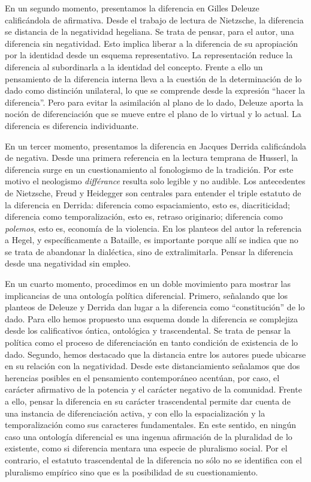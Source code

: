 En un segundo momento, presentamos la diferencia en Gilles Deleuze calificándola de afirmativa. Desde el trabajo de lectura de Nietzsche, la diferencia se distancia de la negatividad hegeliana. Se trata de pensar, para el autor, una diferencia sin negatividad. Esto implica liberar a la diferencia de su apropiación por la identidad desde un esquema representativo. La representación reduce la diferencia al subordinarla a la identidad del concepto. Frente a ello un pensamiento de la diferencia interna lleva a la cuestión de la determinación de lo dado como distinción unilateral, lo que se comprende desde la expresión \enquote{hacer la diferencia}. Pero para evitar la asimilación al plano de lo dado, Deleuze aporta la noción de diferenciación que se mueve entre el plano de lo virtual y lo actual. La diferencia es diferencia individuante.

En un tercer momento, presentamos la diferencia en Jacques Derrida calificándola de negativa. Desde una primera referencia en la lectura temprana de Husserl, la diferencia surge en un cuestionamiento al fonologismo de la tradición. Por este motivo el neologismo \emph{différance} resulta solo legible y no audible. Los antecedentes de Nietzsche, Freud y Heidegger son centrales para entender el triple estatuto de la diferencia en Derrida: diferencia como espaciamiento, esto es, diacriticidad; diferencia como temporalización, esto es, retraso originario; diferencia como \emph{polemos}, esto es, economía de la violencia. En los planteos del autor la referencia a Hegel, y específicamente a Bataille, es importante porque allí se indica que no se trata de abandonar la dialéctica, sino de extralimitarla. Pensar la diferencia desde una negatividad sin empleo.

En un cuarto momento, procedimos en un doble movimiento para mostrar las implicancias de una ontología política diferencial. Primero, señalando que los planteos de Deleuze y Derrida dan lugar a la diferencia como \enquote{constitución} de lo dado. Para ello hemos propuesto una esquema donde la diferencia se complejiza desde los calificativos óntica, ontológica y trascendental. Se trata de pensar la política como el proceso de diferenciación en tanto condición de existencia de lo dado. Segundo, hemos destacado que la distancia entre los autores puede ubicarse en su relación con la negatividad. Desde este distanciamiento señalamos que dos herencias posibles en el pensamiento contemporáneo acentúan, por caso, el carácter afirmativo de la potencia y el carácter negativo de la comunidad. Frente a ello, pensar la diferencia en su carácter trascendental permite dar cuenta de una instancia de diferenciación activa, y con ello la espacialización y la temporalización como sus caracteres fundamentales. En este sentido, en ningún caso una ontología diferencial es una ingenua afirmación de la pluralidad de lo existente, como si diferencia mentara una especie de pluralismo social. Por el contrario, el estatuto trascendental de la diferencia no sólo no se identifica con el pluralismo empírico sino que es la posibilidad de su cuestionamiento.

